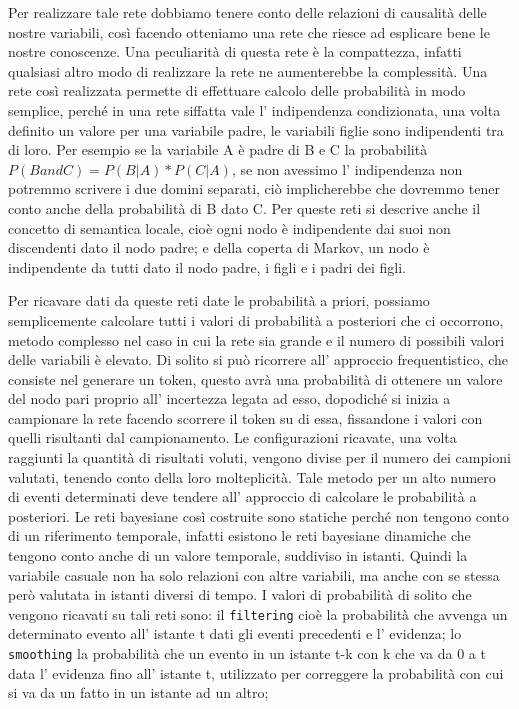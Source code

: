 		Per realizzare tale rete dobbiamo tenere conto delle relazioni di causalità delle nostre variabili, così facendo otteniamo una rete che riesce ad esplicare bene le nostre conoscenze. Una peculiarità di questa rete è la compattezza, infatti qualsiasi altro modo di realizzare la rete ne aumenterebbe la complessità. Una rete così realizzata permette di effettuare calcolo delle probabilità in modo semplice, perché  in una rete siffatta vale l' indipendenza condizionata, una volta definito un valore per una variabile padre, le variabili figlie sono indipendenti tra di loro. Per esempio se la variabile A è padre di B e C la probabilità $P(B and C)=P(B|A)*P(C|A)$, se non avessimo l' indipendenza non potremmo scrivere i due domini separati, ciò implicherebbe che dovremmo tener conto anche della probabilità di B dato C. Per queste reti si descrive anche il concetto di semantica locale, cioè ogni nodo è indipendente dai suoi non discendenti dato il nodo padre; e della coperta di Markov, un nodo è indipendente da tutti dato il nodo padre, i figli e i padri dei figli.
		\par  
		Per ricavare dati da queste reti date le probabilità a priori, possiamo semplicemente calcolare tutti i valori di probabilità a posteriori che ci occorrono, metodo complesso nel caso in cui la rete sia grande e il numero di possibili valori delle variabili è elevato. Di solito si può ricorrere all' approccio frequentistico, che consiste nel generare un token, questo avrà una probabilità di ottenere un valore del nodo pari proprio all' incertezza legata ad esso, dopodiché si inizia a campionare la rete facendo scorrere il token su di essa, fissandone i valori con quelli risultanti dal campionamento. Le configurazioni ricavate, una volta raggiunti la quantità di risultati voluti, vengono divise per il numero dei campioni valutati, tenendo conto della loro molteplicità. Tale metodo per un alto numero di eventi determinati deve tendere all' approccio di calcolare le probabilità a posteriori. Le reti bayesiane così costruite sono statiche perché non tengono conto di un riferimento temporale, infatti esistono le reti bayesiane dinamiche che tengono conto anche di un valore temporale, suddiviso in istanti. Quindi la variabile casuale non ha solo relazioni con altre variabili, ma anche con se stessa però valutata in istanti diversi di tempo. I valori di probabilità di solito che vengono ricavati su tali reti sono: il \texttt{filtering} cioè la probabilità che avvenga un determinato evento all' istante t dati gli eventi precedenti e l' evidenza; lo \texttt{smoothing} la probabilità che un evento in un istante t-k con k che va da 0 a t data l' evidenza fino all' istante t, utilizzato per correggere la probabilità con cui si va da un fatto in un istante ad un altro;
